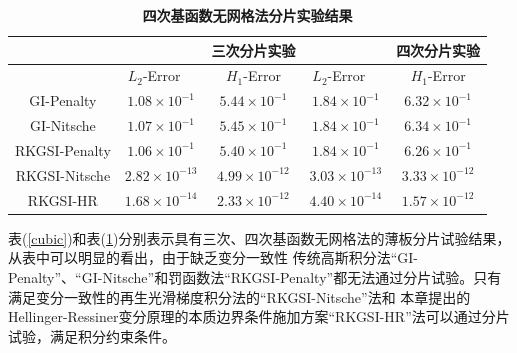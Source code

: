 \begin{table}[H]
    \caption{\textbf{四次基函数无网格法分片实验结果}}
    \centering\label{quartic}
   \begin{tabular}{ccccc}
   \toprule
   &$\quad$ &三次分片实验 &$\quad$ &四次分片实验\\
   \midrule
   &$L_2$-Error$\quad$&$H_1$-Error&$L_2$-Error$\quad$&$H_1$-Error\\
   \midrule
   GI-Penalty&$1.08\times10^{-1}$&$5.44\times10^{-1}$&$1.84\times10^{-1}$&$6.32\times10^{-1}$\\
   GI-Nitsche&$1.07\times10^{-1}$&$5.45\times10^{-1}$&$1.84\times10^{-1}$&$6.34\times10^{-1}$\\
  RKGSI-Penalty&$1.06\times10^{-1}$&$5.40\times10^{-1}$&$1.84\times10^{-1}$&$6.26\times10^{-1}$\\
  RKGSI-Nitsche&$2.82\times10^{-13}$&$4.99\times10^{-12}$&$3.03\times10^{-13}$&$3.33\times10^{-12}$\\
  RKGSI-HR&$1.68\times10^{-14}$&$2.33\times10^{-12}$&$4.40\times10^{-14}$&$1.57\times10^{-12}$\\
\bottomrule
\end{tabular}
\end{table}\par
表(\ref{cubic})和表(\ref{quartic})分别表示具有三次、四次基函数无网格法的薄板分片试验结果，从表中可以明显的看出，由于缺乏变分一致性
传统高斯积分法“GI-Penalty”、“GI-Nitsche”和罚函数法“RKGSI-Penalty”都无法通过分片试验。只有满足变分一致性的再生光滑梯度积分法的“RKGSI-Nitsche”法和
本章提出的Hellinger-Ressiner变分原理的本质边界条件施加方案“RKGSI-HR”法可以通过分片试验，满足积分约束条件。
